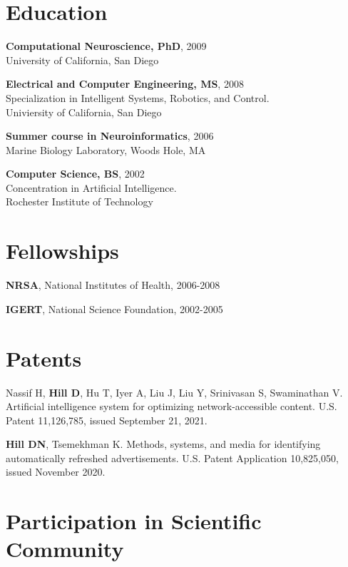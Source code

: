 \documentclass[line,11pt]{res}
\begin{document}
\begin{resume}
\section{Education}
\vspace{0.1in} 
 
 	\textbf{Computational Neuroscience, PhD}, 2009 \\
    University of California, San Diego
 
 	\textbf{Electrical and Computer Engineering, MS}, 2008 \\    
    Specialization in Intelligent Systems, Robotics, and Control.\\
    Univiersity of California, San Diego
    
 	\textbf{Summer course in Neuroinformatics}, 2006 \\
    Marine Biology Laboratory, Woods Hole, MA 
    
 	\textbf{Computer Science, BS}, 2002 \\
    Concentration in Artificial Intelligence. \\
    Rochester Institute of Technology
    
\section{Fellowships}
\vspace{0.1in} 
 
 	\textbf{NRSA}, National Institutes of Health, 2006-2008
    
    \textbf{IGERT}, National Science Foundation, 2002-2005

\section{Patents}
\vspace{0.1in}
Nassif H, \textbf{Hill D}, Hu T, Iyer A, Liu J, Liu Y, Srinivasan S, Swaminathan V. Artificial intelligence system for optimizing network-accessible content. U.S. Patent 11,126,785, issued September 21, 2021.

\textbf{Hill DN}, Tsemekhman K. Methods, systems, and media for identifying automatically refreshed advertisements. U.S. Patent Application 10,825,050, issued November 2020.


\section{Participation in Scientific Community}
\vspace{0.1in} 


\end{resume}
\end{document}
